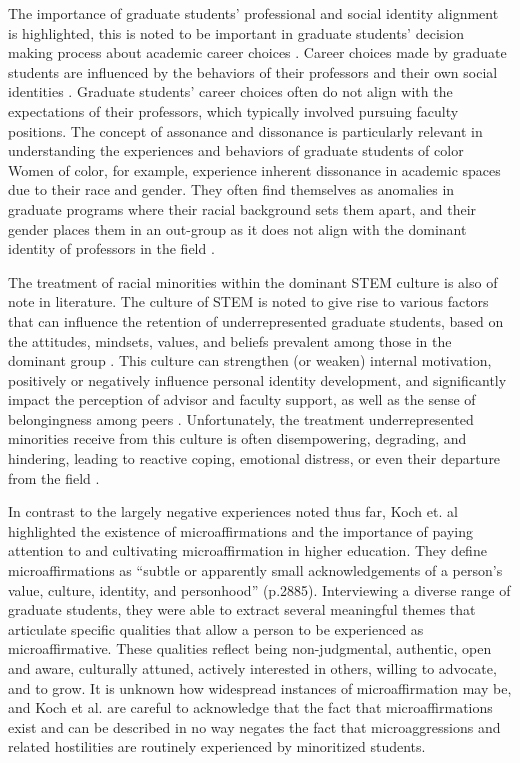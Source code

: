 \documentclass[
  11pt,
]{book}
\begin{document}
The importance of graduate students' professional and social identity alignment is highlighted, this is noted to be important in graduate students' decision making process about academic career choices \citep{levin_graduate_2013}. Career choices made by graduate students are influenced by the behaviors of their professors and their own social identities \citep{levin_graduate_2013}. Graduate students' career choices often do not align with the expectations of their professors, which typically involved pursuing faculty positions. The concept of assonance and dissonance is particularly relevant in understanding the experiences and behaviors of graduate students of color \citep{levin_graduate_2013} Women of color, for example, experience inherent dissonance in academic spaces due to their race and gender. They often find themselves as anomalies in graduate programs where their racial background sets them apart, and their gender places them in an out-group as it does not align with the dominant identity of professors in the field \citep{levin_graduate_2013}.

The treatment of racial minorities within the dominant STEM culture is also of note in literature. The culture of STEM is noted to give rise to various factors that can influence the retention of underrepresented graduate students, based on the attitudes, mindsets, values, and beliefs prevalent among those in the dominant group \citep{curry_systematized_2020}. This culture can strengthen (or weaken) internal motivation, positively or negatively influence personal identity development, and significantly impact the perception of advisor and faculty support, as well as the sense of belongingness among peers \citep{curry_systematized_2020, miller_values_2020}. Unfortunately, the treatment underrepresented minorities receive from this culture is often disempowering, degrading, and hindering, leading to reactive coping, emotional distress, or even their departure from the field \citep{curry_systematized_2020}.

In contrast to the largely negative experiences noted thus far, Koch et. al \citeyearpar{koch_qualitative_2022} highlighted the existence of microaffirmations and the importance of paying attention to and cultivating microaffirmation in higher education. They define microaffirmations as ``subtle or apparently small acknowledgements of a person's value, culture, identity, and personhood'' (p.2885). Interviewing a diverse range of graduate students, they were able to extract several meaningful themes that articulate specific qualities that allow a person to be experienced as microaffirmative. These qualities reflect being non-judgmental, authentic, open and aware, culturally attuned, actively interested in others, willing to advocate, and to grow. It is unknown how widespread instances of microaffirmation may be, and Koch et al. \citeyearpar{koch_qualitative_2022} are careful to acknowledge that the fact that microaffirmations exist and can be described in no way negates the fact that microaggressions and related hostilities are routinely experienced by minoritized students.
\end{document}
